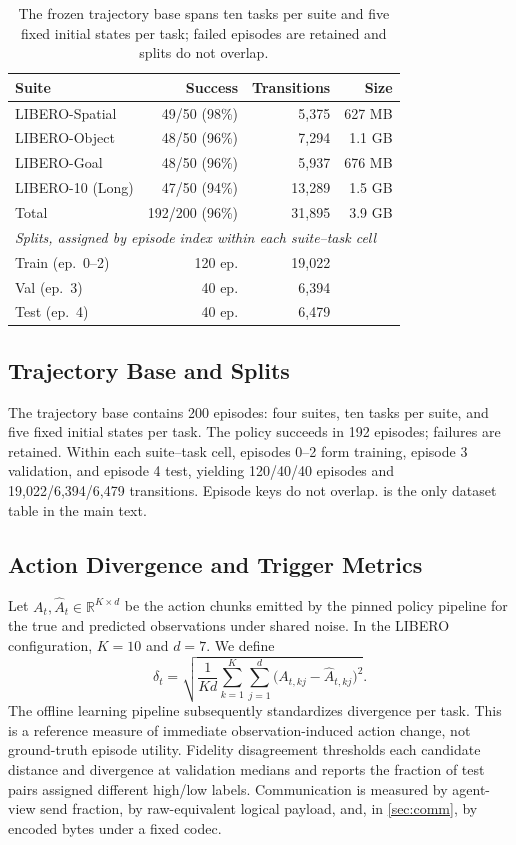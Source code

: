 \documentclass[sigconf,10pt,anonymous,review]{acmart}
\newcommand{\dt}{\delta_t}
\begin{document}
\begin{table}[t]
\caption{The frozen trajectory base spans ten tasks per suite and five fixed
initial states per task; failed episodes are retained and splits do not overlap.}
\label{tab:data}
\small
\begin{tabular}{lrrr}
\toprule
Suite & Success & Transitions & Size \\
\midrule
LIBERO-Spatial   & 49/50 (98\%) & 5{,}375  & 627 MB \\
LIBERO-Object    & 48/50 (96\%) & 7{,}294  & 1.1 GB \\
LIBERO-Goal      & 48/50 (96\%) & 5{,}937  & 676 MB \\
LIBERO-10 (Long) & 47/50 (94\%) & 13{,}289 & 1.5 GB \\
\midrule
Total            & 192/200 (96\%) & 31{,}895 & 3.9 GB \\
\midrule
\multicolumn{4}{l}{\emph{Splits, assigned by episode index within each suite--task cell}}\\
Train (ep.\ 0--2) & 120 ep. & 19{,}022 & \\
Val (ep.\ 3)      & 40 ep.  & 6{,}394  & \\
Test (ep.\ 4)     & 40 ep.  & 6{,}479  & \\
\bottomrule
\end{tabular}
\end{table}

\subsection{Trajectory Base and Splits}
The trajectory base contains 200 episodes: four suites, ten tasks per suite,
and five fixed initial states per task. The policy succeeds in 192 episodes;
failures are retained. Within each suite--task cell, episodes 0--2 form
training, episode 3 validation, and episode 4 test, yielding 120/40/40
episodes and 19{,}022/6{,}394/6{,}479 transitions. Episode keys do not
overlap.  is the only dataset table in the main text.

\subsection{Action Divergence and Trigger Metrics}
Let $A_t,\hat A_t\in\mathbb{R}^{K\times d}$ be the action chunks emitted by
the pinned policy pipeline for the true and predicted observations under
shared noise. In the LIBERO configuration, $K=10$ and $d=7$. We define
\begin{equation}
\dt=\sqrt{\frac{1}{Kd}\sum_{k=1}^{K}\sum_{j=1}^{d}
      \bigl(A_{t,kj}-\hat A_{t,kj}\bigr)^2}.
\label{eq:div}
\end{equation}
The offline learning pipeline subsequently standardizes divergence per task.
This is a reference measure of immediate observation-induced action change,
not ground-truth episode utility. Fidelity disagreement thresholds each
candidate distance and divergence at validation medians and reports the
fraction of test pairs assigned different high/low labels. Communication is
measured by agent-view send fraction, by raw-equivalent logical payload,
and, in \cref{sec:comm}, by encoded bytes under a fixed codec.
\end{document}
